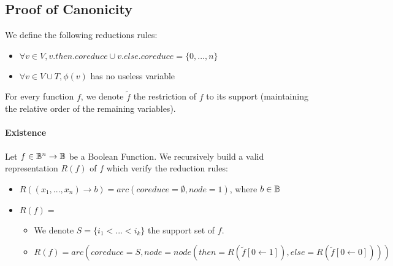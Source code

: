 \documentclass[a4paper,10pt]{article}
\begin{document}
\subsection{Proof of Canonicity}

We define the following reductions rules:\begin{itemize}
  \item $\forall v\in V, v.then.coreduce \cup v.else.coreduce = \{0, ..., n\}$
  \item $\forall v\in V\cup T, \phi(v)$ has no useless variable
\end{itemize}

For every function $f$, we denote $\tilde{f}$ the restriction of $f$ to its support (maintaining the relative order of the remaining variables).

\paragraph{Existence}
Let $f\in\mathbb{B}^n\rightarrow\mathbb{B}$ be a Boolean Function. We recursively build a valid representation $R(f)$ of $f$ which verify the reduction rules:\begin{itemize}
  \item $R((x_1, ..., x_n) \rightarrow b) = arc(coreduce = \emptyset, node = 1)$, where $b\in\mathbb{B}$
  \item $R(f) = $\begin{itemize}
    \item We denote $S=\{i_1 < ... < i_k\}$ the support set of $f$.
    \item $R(f) = arc(coreduce = S, node = node(then = R(\tilde{f}[0\leftarrow 1]), else = R(\tilde{f}[0\leftarrow 0])))$
  \end{itemize}
\end{itemize}
\end{document}
